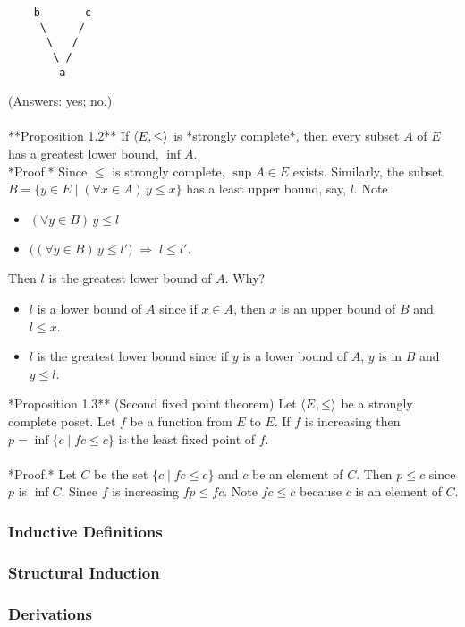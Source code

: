 \begin{verbatim}
    b       c
     \     /
      \   /
       \ /
        a
\end{verbatim}
(Answers: yes; no.)\\
\\
**Proposition 1.2** If $\langle E, \leq\rangle$ is
*strongly complete*, then every subset $A$ of $E$ has a 
greatest lower bound, $\inf A$.\\[4pt]
*Proof.* 
Since $\leq$ is strongly complete, $\sup  A\in E$ exists.
Similarly, the subset $B = \{ y \in E \mid (\forall x \in A)\, y \leq x \}$ 
has a least upper bound, say, $l$. Note
\begin{itemize}
\item $(\forall y\in B) \, y \leq l$
\item $\bigl((\forall y\in B)\, y \leq l'\bigr)\; \Rightarrow \; l \leq l'$.
\end{itemize}

Then $l$ is the greatest lower bound of $A$. Why?
\begin{itemize}
\item 
 $l$ is a lower bound of $A$ since if $x \in A$, then $x$ is an upper bound of $B$ and
 $l \leq x$.
\item $l$ is the greatest lower bound since if $y$ is a lower bound of $A$, 
$y$ is in $B$ and $y \leq l$.
\end{itemize}

\medskip

\noindent **Proposition 1.3** (Second fixed point theorem) Let $\langle E, \leq\rangle$ be a strongly
  complete poset.  Let $f$ be a function from $E$ to $E$. If
  $f$ is increasing then $p = \inf \{c \mid f c \leq c\}$ is the least fixed point
  of $f$.\\
\\
*Proof.* Let $C$ be the set $\{c \mid f c \leq c\}$ and $c$ be an element of $C$. Then
 $p \leq c$ since $p$ is $\inf C$. Since $f$ is increasing $f p \leq f c$. Note 
 $f c \leq c$ because $c$ is an element of $C$. 

\subsubsection{Inductive Definitions}
\subsubsection{Structural Induction}
\subsubsection{Derivations}
